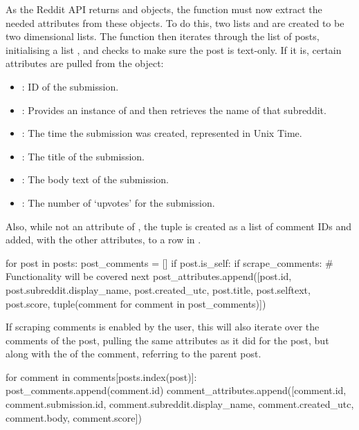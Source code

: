 As the Reddit API returns  and  objects, the function must now extract the needed attributes from these objects. To do this, two lists  and  are created to be two dimensional lists. The function then iterates through the list of posts, initialising a list , and checks  to make sure the post is text-only. If it is, certain attributes are pulled from the  object:

\begin{itemize}
    \item {}: ID of the submission.
    \item {}: Provides an instance of  and then retrieves the name of that subreddit.
    \item {}: The time the submission was created, represented in Unix Time. 
    \item {}: The title of the submission.
    \item {}: The body text of the submission.
    \item {}: The number of `upvotes' for the submission.
\end{itemize}

Also, while not an attribute of , the tuple  is created as a list of comment IDs and added, with the other attributes, to a row in .

\begin{python}
for post in posts:
    post_comments = []
    if post.is_self:
        if scrape_comments:
            # Functionality will be covered next
        post_attributes.append([post.id, post.subreddit.display_name, post.created_utc, post.title, post.selftext, post.score, tuple(comment for comment in post_comments)])
\end{python}

If scraping comments is enabled by the user, this will also iterate over the comments of the post, pulling the same attributes as it did for the post, but along with the  of the comment, referring to the parent post.

\begin{python}
for comment in comments[posts.index(post)]:
    post_comments.append(comment.id)
    comment_attributes.append([comment.id, comment.submission.id, comment.subreddit.display_name, comment.created_utc, comment.body, comment.score])
\end{python}

